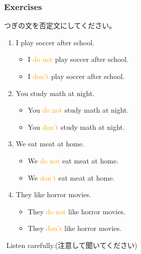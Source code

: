 \documentclass[aspectratio=169,xcolor={dvipsnames,table}]{beamer}
\newcommand{\myaudio}[1]{\href{#1}{\faVolumeUp}}
\begin{document}
\begin{frame}[plain]\frametitle{Exercises}
 
つぎの文を否定文にしてください。
\begin{enumerate}
 \item I play soccer after school.\pause{}\hspace{63pt}{\footnotesize after school: 放課後に}\pause
         \begin{itemize}
	 \item I \textcolor{orange}{do not} play soccer after school.\\\pause
	  \item I \textcolor{orange}{don't} play soccer after school.\pause
	\end{itemize}
 \item You study math at night.\pause\hspace{68pt}{\footnotesize study: 勉強する　math: 数学　at night: 夜に}\\\pause
       \begin{itemize}
	\item You \textcolor{orange}{do not} study math at night.\\\pause
	\item You \textcolor{orange}{don't} study math at night.\pause
       \end{itemize}
 \item We eat meat at home.\pause\hspace{80pt}{\footnotesize eat: 食べる　meat: 肉}\\\pause
\begin{itemize}
 \item We \textcolor{orange}{do not} eat meat at home.\\\pause
 \item We \textcolor{orange}{don't} eat meat at home.\pause
\end{itemize}
 \item They like horror movies.\pause\hspace{70pt}{\footnotesize horror movie: ホラー映画}\\\pause
\begin{itemize}
 \item They \textcolor{orange}{do not} like horror movies.\\\pause
 \item They \textcolor{orange}{don't} like horror movies.
\end{itemize}
\end{enumerate}

\myaudio{audio/007_negative_do_01.mp3}\,\,{}Listen carefully.(注意して聞いてください)

\end{frame}
\end{document}
